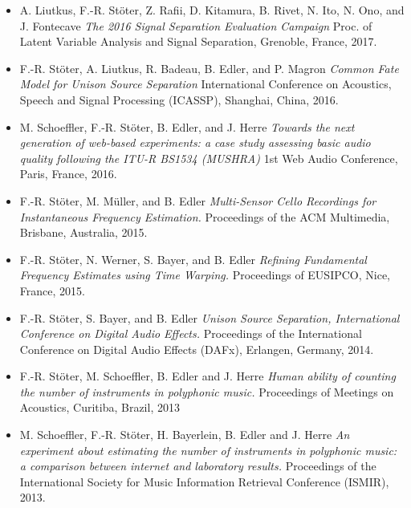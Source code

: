 \documentclass[a4paper,11pt]{article}
\begin{document}
\begin{itemize}
\item
  A. Liutkus, F.-R. Stöter, Z. Rafii, D. Kitamura, B. Rivet, N.
  Ito, N. Ono, and J. Fontecave \emph{The 2016 Signal Separation Evaluation
  Campaign} Proc. of Latent Variable Analysis and Signal Separation, Grenoble, France, 2017.
\item
  F.-R. Stöter, A. Liutkus, R. Badeau, B. Edler, and P. Magron
  \emph{Common Fate Model for Unison Source Separation} International
  Conference on Acoustics, Speech and Signal Processing (ICASSP), 
  Shanghai, China, 2016.
\item
  M. Schoeffler, F.-R. Stöter, B. Edler, and J. Herre \emph{Towards
  the next generation of web-based experiments: a case study assessing
  basic audio quality following the ITU-R BS1534
  (MUSHRA)} 1st Web Audio Conference, Paris, France, 2016.
\item
  F.-R. Stöter, M. Müller, and B. Edler
  \emph{Multi-Sensor Cello Recordings for Instantaneous Frequency
  Estimation.} Proceedings of the ACM Multimedia, Brisbane, Australia, 2015.
\item
  F.-R. Stöter, N. Werner, S. Bayer, and B. Edler \emph{Refining
  Fundamental Frequency Estimates using Time Warping.} Proceedings of
  EUSIPCO, Nice, France, 2015.
\item
  F.-R. Stöter, S. Bayer, and B. Edler \emph{Unison Source
  Separation, International Conference on Digital Audio Effects.}
  Proceedings of the International Conference on Digital Audio Effects
  (DAFx), Erlangen, Germany, 2014.
\item
  F.-R. Stöter, M. Schoeffler, B. Edler and J. Herre \emph{Human
  ability of counting the number of instruments in polyphonic music.}
  Proceedings of Meetings on Acoustics, Curitiba, Brazil, 2013
\item
  M. Schoeffler, F.-R. Stöter, H. Bayerlein, B. Edler and J. Herre
  \emph{An experiment about estimating the number of instruments in
  polyphonic music: a comparison between internet and laboratory
  results.} Proceedings of the International Society for Music
  Information Retrieval Conference (ISMIR), 2013.
\end{itemize}
\end{document}
